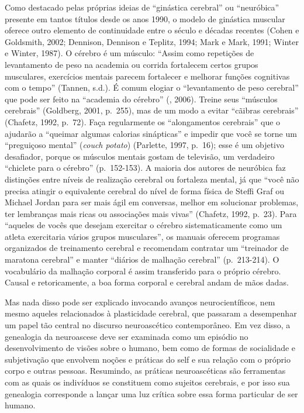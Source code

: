 Como destacado pelas próprias ideias de ``ginástica cerebral'' ou
``neuróbica'' presente em tantos títulos desde os anos 1990, o modelo de
ginástica muscular oferece outro elemento de continuidade entre o século
 e décadas recentes (Cohen e Goldsmith, 2002; Dennison, Dennison e
Teplitz, 1994; Mark e Mark, 1991; Winter e Winter, 1987). O cérebro é um
músculo: ``Assim como repetições de levantamento de peso na academia ou
corrida fortalecem certos grupos musculares, exercícios mentais parecem
fortalecer e melhorar funções cognitivas com o tempo'' (Tannen, s.d.). É
comum elogiar o ``levantamento de peso cerebral'' que pode ser feito na
``academia do cérebro'' (, 2006). Treine seus ``músculos cerebrais''
(Goldberg, 2001, p.~255), mas de um modo a evitar ``cãibras cerebrais''
(Chafetz, 1992, p.~72). Faça regularmente os ``alongamentos cerebrais''
que o ajudarão a ``queimar algumas calorias sinápticas'' e impedir que
você se torne um ``preguiçoso mental'' (\emph{couch potato}) (Parlette,
1997, p.~16); esse é um objetivo desafiador, porque os músculos mentais
gostam de televisão, um verdadeiro ``chiclete para o cérebro''
(p.~152-153). A maioria dos autores de neuróbica faz distinções entre
níveis de realização cerebral ou fortaleza mental, já que ``você não
precisa atingir o equivalente cerebral do nível de forma física de
Steffi Graf ou Michael Jordan para ser mais ágil em conversas, melhor em
solucionar problemas, ter lembranças mais ricas ou associações mais
vivas'' (Chafetz, 1992, p.~23). Para ``aqueles de vocês que desejam
exercitar o cérebro sistematicamente como um atleta exercitaria vários
grupos musculares'', os manuais oferecem programas organizados de
treinamento cerebral e recomendam contratar um ``treinador de maratona
cerebral'' e manter ``diários de malhação cerebral'' (p.~213-214). O
vocabulário da malhação corporal é assim transferido para o próprio
cérebro. Causal e retoricamente, a boa forma corporal e cerebral andam
de mãos dadas.

Mas nada disso pode ser explicado invocando avanços neurocientíficos,
nem mesmo aqueles relacionados à plasticidade cerebral, que passaram a
desempenhar um papel tão central no discurso neuroascético
contemporâneo. Em vez disso, a genealogia da neuroascese deve ser
examinada como um episódio no desenvolvimento de visões sobre o humano,
bem como de formas de socialidade e subjetivação que envolvem noções e
práticas do self e sua relação com o próprio corpo e outras pessoas.
Resumindo, as práticas neuroascéticas são ferramentas com as quais os
indivíduos se constituem como sujeitos cerebrais, e por isso sua
genealogia corresponde a lançar uma luz crítica sobre essa forma
particular de ser humano.

